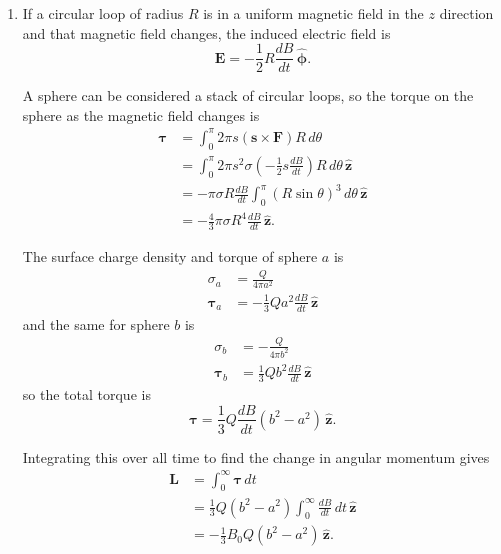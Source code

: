 \documentclass{article}
\renewcommand{\vec}[1]{\boldsymbol{\mathbf{#1}}}
\newcommand{\uvec}[1]{\hat{\vec{#1}}}
\begin{document}
\begin{enumerate}
  \item

        If a circular loop of radius $R$ is in a uniform magnetic field in the $z$ direction and that magnetic field changes, the induced electric field is \[\vec{E} = -\frac{1}{2} R \frac{d B}{d t} \,\uvec{\phi}.\]

        A sphere can be considered a stack of circular loops, so the torque on the sphere as the magnetic field changes is \begin{align*}
          \vec{\tau} & = \int_0^\pi 2 \pi s (\vec{s} \times \vec{F}) R \,d \theta                                          \\
                     & = \int_0^\pi 2 \pi s^2 \sigma \left( -\frac{1}{2} s \frac{d B}{d t} \right) R \,d \theta \,\uvec{z} \\
                     & = -\pi \sigma R \frac{d B}{d t} \int_0^\pi (R \sin \theta)^3 \,d \theta \,\uvec{z}                  \\
                     & = -\frac{4}{3} \pi \sigma R^4 \frac{d B}{d t} \,\uvec{z}.
        \end{align*}

        The surface charge density and torque of sphere $a$ is \begin{align*}
          \sigma_a     & = \frac{Q}{4 \pi a^2}                           \\
          \vec{\tau}_a & = -\frac{1}{3} Q a^2 \frac{d B}{d t} \,\uvec{z}
        \end{align*} and the same for sphere $b$ is \begin{align*}
          \sigma_b     & = -\frac{Q}{4 \pi b^2}                         \\
          \vec{\tau}_b & = \frac{1}{3} Q b^2 \frac{d B}{d t} \,\uvec{z}
        \end{align*} so the total torque is \[\vec{\tau} = \frac{1}{3} Q \frac{d B}{d t} (b^2 - a^2) \,\uvec{z}.\]

        Integrating this over all time to find the change in angular momentum gives \begin{align*}
          \vec{L} & = \int_0^\infty \vec{\tau} \,d t                                           \\
                  & = \frac{1}{3} Q (b^2 - a^2) \int_0^\infty \frac{d B}{d t} \,d t \,\uvec{z} \\
                  & = -\frac{1}{3} B_0 Q (b^2 - a^2) \,\uvec{z}.
        \end{align*}
\end{enumerate}
\end{document}
